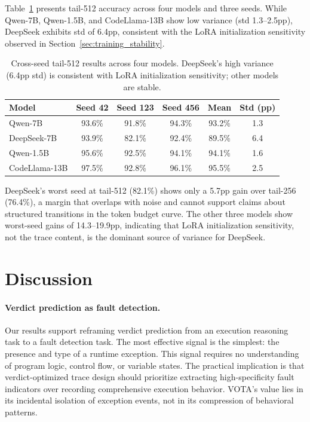 \documentclass[11pt]{article}
\begin{document}
Table~\ref{tab:cross_seed_512} presents tail-512 accuracy across four models and three seeds. While Qwen-7B, Qwen-1.5B, and CodeLlama-13B show low variance (std 1.3--2.5pp), DeepSeek exhibits std of 6.4pp, consistent with the LoRA initialization sensitivity observed in Section~\ref{sec:training_stability}.

\begin{table}[t]
\centering
\caption{Cross-seed tail-512 results across four models. DeepSeek's high variance (6.4pp std) is consistent with LoRA initialization sensitivity; other models are stable.}
\label{tab:cross_seed_512}
\begin{tabular}{lccccc}
\toprule
Model & Seed 42 & Seed 123 & Seed 456 & Mean & Std (pp) \\
\midrule
Qwen-7B & 93.6\% & 91.8\% & 94.3\% & 93.2\% & 1.3 \\
DeepSeek-7B & 93.9\% & 82.1\% & 92.4\% & 89.5\% & 6.4 \\
Qwen-1.5B & 95.6\% & 92.5\% & 94.1\% & 94.1\% & 1.6 \\
CodeLlama-13B & 97.5\% & 92.8\% & 96.1\% & 95.5\% & 2.5 \\
\bottomrule
\end{tabular}
\end{table}

DeepSeek's worst seed at tail-512 (82.1\%) shows only a 5.7pp gain over tail-256 (76.4\%), a margin that overlaps with noise and cannot support claims about structured transitions in the token budget curve. The other three models show worst-seed gains of 14.3--19.9pp, indicating that LoRA initialization sensitivity, not the trace content, is the dominant source of variance for DeepSeek.

\section{Discussion}
\label{sec:discussion}

\paragraph{Verdict prediction as fault detection.}
Our results support reframing verdict prediction from an execution reasoning task to a fault detection task. The most effective signal is the simplest: the presence and type of a runtime exception. This signal requires no understanding of program logic, control flow, or variable states. The practical implication is that verdict-optimized trace design should prioritize extracting high-specificity fault indicators over recording comprehensive execution behavior. VOTA's value lies in its incidental isolation of exception events, not in its compression of behavioral patterns.
\end{document}

